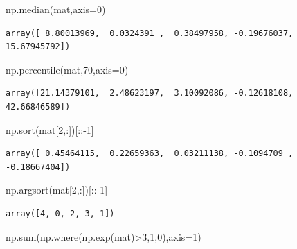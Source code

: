 \documentclass[
  letterpaper,
  DIV=11,
  numbers=noendperiod]{scrreprt}
\newenvironment{Shaded}{\begin{snugshade}}{\end{snugshade}}
\newcommand{\BuiltInTok}[1]{\textcolor[rgb]{0.00,0.23,0.31}{#1}}
\newcommand{\DecValTok}[1]{\textcolor[rgb]{0.68,0.00,0.00}{#1}}
\newcommand{\NormalTok}[1]{\textcolor[rgb]{0.00,0.23,0.31}{#1}}
\newcommand{\OperatorTok}[1]{\textcolor[rgb]{0.37,0.37,0.37}{#1}}
\begin{document}
\begin{Shaded}
\begin{Highlighting}[]
\NormalTok{np.median(mat,axis}\OperatorTok{=}\DecValTok{0}\NormalTok{)}
\end{Highlighting}
\end{Shaded}

\begin{verbatim}
array([ 8.80013969,  0.0324391 ,  0.38497958, -0.19676037, 15.67945792])
\end{verbatim}

\begin{Shaded}
\begin{Highlighting}[]
\NormalTok{np.percentile(mat,}\DecValTok{70}\NormalTok{,axis}\OperatorTok{=}\DecValTok{0}\NormalTok{)}
\end{Highlighting}
\end{Shaded}

\begin{verbatim}
array([21.14379101,  2.48623197,  3.10092086, -0.12618108, 42.66846589])
\end{verbatim}

\begin{Shaded}
\begin{Highlighting}[]
\NormalTok{np.sort(mat[}\DecValTok{2}\NormalTok{,:])[::}\OperatorTok{{-}}\DecValTok{1}\NormalTok{]}
\end{Highlighting}
\end{Shaded}

\begin{verbatim}
array([ 0.45464115,  0.22659363,  0.03211138, -0.1094709 , -0.18667404])
\end{verbatim}

\begin{Shaded}
\begin{Highlighting}[]
\NormalTok{np.argsort(mat[}\DecValTok{2}\NormalTok{,:])[::}\OperatorTok{{-}}\DecValTok{1}\NormalTok{]}
\end{Highlighting}
\end{Shaded}

\begin{verbatim}
array([4, 0, 2, 3, 1])
\end{verbatim}

\begin{Shaded}
\begin{Highlighting}[]
\NormalTok{np.}\BuiltInTok{sum}\NormalTok{(np.where(np.exp(mat)}\OperatorTok{\textgreater{}}\DecValTok{3}\NormalTok{,}\DecValTok{1}\NormalTok{,}\DecValTok{0}\NormalTok{),axis}\OperatorTok{=}\DecValTok{1}\NormalTok{)}
\end{Highlighting}
\end{Shaded}
\end{document}
